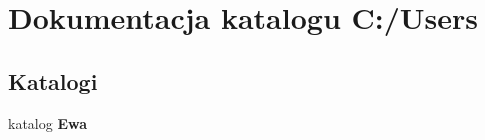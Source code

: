 \section{Dokumentacja katalogu C\+:/\+Users}
\label{dir_d522931ffa1371640980b621734a4381}
\subsection*{Katalogi}
\begin{DoxyCompactItemize}
\item 
katalog \textbf{ Ewa}
\end{DoxyCompactItemize}
